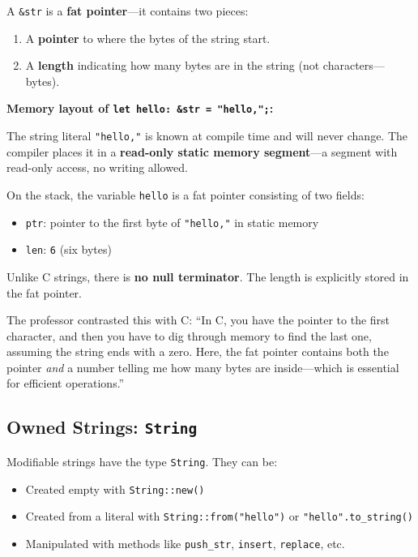 A \texttt{\&str} is a \textbf{fat pointer}---it contains two pieces:
\begin{enumerate}
    \item A \textbf{pointer} to where the bytes of the string start.
    \item A \textbf{length} indicating how many bytes are in the string (not characters---bytes).
\end{enumerate}

\begin{memoryblock}
\textbf{Memory layout of \texttt{let hello: \&str = "hello,";}:}

The string literal \texttt{"hello,"} is known at compile time and will never change. The compiler places it in a \textbf{read-only static memory segment}---a segment with read-only access, no writing allowed.

On the stack, the variable \texttt{hello} is a fat pointer consisting of two fields:
\begin{itemize}
    \item \texttt{ptr}: pointer to the first byte of \texttt{"hello,"} in static memory
    \item \texttt{len}: \texttt{6} (six bytes)
\end{itemize}

Unlike C strings, there is \textbf{no null terminator}. The length is explicitly stored in the fat pointer.
\end{memoryblock}

The professor contrasted this with C: ``In C, you have the pointer to the first character, and then you have to dig through memory to find the last one, assuming the string ends with a zero. Here, the fat pointer contains both the pointer \emph{and} a number telling me how many bytes are inside---which is essential for efficient operations.''

\subsection{Owned Strings: \texttt{String}}

Modifiable strings have the type \texttt{String}. They can be:
\begin{itemize}
    \item Created empty with \texttt{String::new()}
    \item Created from a literal with \texttt{String::from("hello")} or \texttt{"hello".to\_string()}
    \item Manipulated with methods like \texttt{push\_str}, \texttt{insert}, \texttt{replace}, etc.
\end{itemize}


